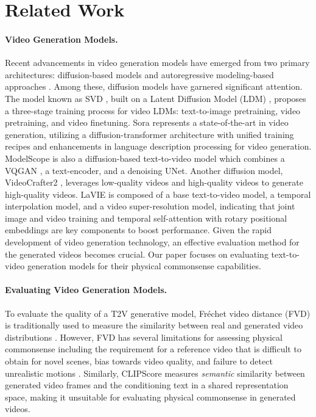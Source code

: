 \section{Related Work}
\label{sec:detailed_related_work}



\paragraph{Video Generation Models.}
Recent advancements in video generation models have emerged from two primary architectures: diffusion-based models \cite{gen2, svd, liu2024sora, blattmann2023align, wang2023lavie, wang2023modelscope, chen2024videocrafter2, khachatryan2023text2video} and autoregressive modeling-based approaches \cite{magvit2, kondratyuk2023videopoet, hong2022cogvideo, villegas2022phenaki}. Among these, diffusion models have garnered significant attention. The model known as SVD \cite{svd}, built on a Latent Diffusion Model (LDM) \cite{ldm}, proposes a three-stage training process for video LDMs: text-to-image pretraining, video pretraining, and video finetuning. Sora \cite{liu2024sora} represents a state-of-the-art in video generation, utilizing a diffusion-transformer architecture with unified training recipes and enhancements in language description processing for video generation. ModelScope \cite{wang2023modelscope} is also a diffusion-based text-to-video model which combines a VQGAN \cite{esser2021taming}, a text-encoder, and a denoising UNet. Another diffusion model, VideoCrafter2 \cite{chen2024videocrafter2}, leverages low-quality videos and high-quality videos to generate high-quality videos. LaVIE \cite{wang2023lavie} is composed of a base text-to-video model, a temporal interpolation model, and a video super-resolution model, indicating that joint image and video training and temporal self-attention with rotary positional embeddings are key components to boost performance. Given the rapid development of video generation technology, an effective evaluation method for the generated videos becomes crucial. Our paper focuses on evaluating text-to-video generation models for their physical commonsense capabilities.


\paragraph{Evaluating Video Generation Models.}
To evaluate the quality of a T2V generative model, Fréchet video distance (FVD) is traditionally used to measure the similarity between real and generated video distributions \cite{unterthiner2018towards,bugliarello2024storybench}. However, FVD has several limitations for assessing physical commonsense including the requirement for a reference video that is difficult to obtain for novel scenes, bias towards video quality, and failure to detect unrealistic motions \cite{brooks2022generating,skorokhodov2022stylegan}. Similarly, CLIPScore \cite{radford2021learning} measures \textit{semantic} similarity between generated video frames and the conditioning text in a shared representation space, making it unsuitable for evaluating physical commonsense in generated videos.

